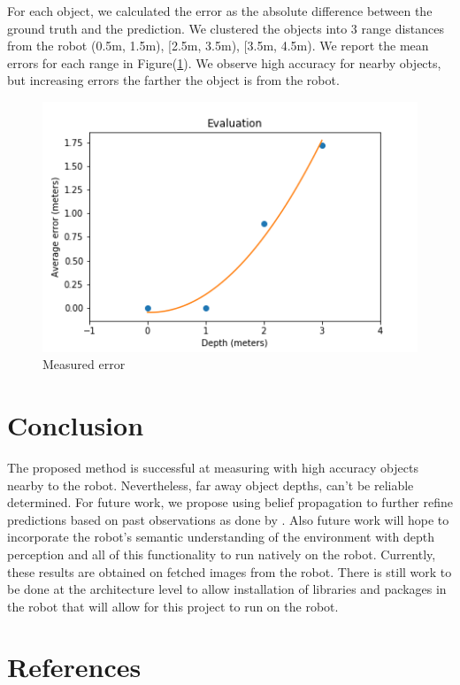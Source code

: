 \documentclass[12pt,letterpaper]{article}
\begin{document}
For each object, we calculated the error as the absolute difference between the ground truth and the prediction. We clustered the objects into 3 range distances from the robot (0.5m, 1.5m), [2.5m, 3.5m), [3.5m, 4.5m). We report the mean errors for each range in Figure(\ref{errors}). We observe high accuracy for nearby objects, but increasing errors the farther the object is from the robot.

\begin{figure}[h]
	\centering
	\includegraphics[width=0.5\linewidth]{./images/errors.png}
	\caption{Measured error }
	\label{errors}
\end{figure}

\section{Conclusion}
The proposed method is successful at measuring with high accuracy objects nearby to the robot. Nevertheless, far away object depths, can't be reliable determined. For future work, we propose using belief propagation to further refine predictions based on past observations as done by \cite{xie2017event}. Also future work will hope to incorporate the robot's semantic understanding of the environment with depth perception and all of this functionality to run natively on the robot. Currently, these results are obtained on fetched images from the robot. There is still work to be done at the architecture level to allow installation of libraries and packages in the robot that will allow for this project to run on the robot.

\section{References}

%

\end{document}
